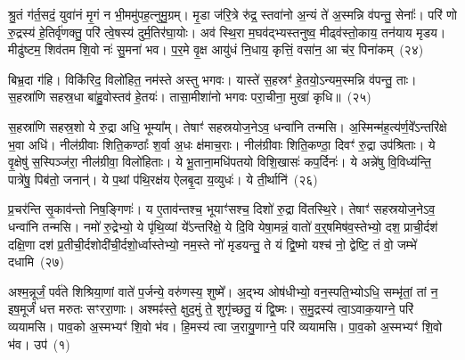 श्रु॒तं ग॑र्त॒सदं॒ युवा॑नं मृ॒गं न भी॒ममु॑पह॒त्नुमु॒ग्रम्। मृ॒डा ज॑रि॒त्रे रु॑द्र॒ स्तवा॑नो अ॒न्यं ते॑ अ॒स्मन्नि व॑पन्तु॒ सेनाः᳚। परि॑ णो रु॒द्रस्य॑ हे॒तिर्वृ॑णक्तु॒ परि॑ त्वे॒षस्य॑ दुर्म॒तिर॑घा॒योः। अव॑ स्थि॒रा म॒घव॑द्भ्यस्तनुष्व॒ मीढ्व॑स्तो॒काय॒ तन॑याय मृडय। मीढु॑ष्टम॒ शिव॑तम शि॒वो नः॑ सु॒मना॑ भव। प॒र॒मे वृ॒क्ष आयु॑धं नि॒धाय॒ कृत्तिं॒ वसा॑न॒ आ च॑र॒ पिना॑कम्~(२४)

बिभ्र॒दा ग॑हि। विकि॑रिद॒ विलो॑हित॒ नम॑स्ते अस्तु भगवः। यास्ते॑ स॒हस्रꣳ॑ हे॒तयो॒\-ऽन्यम॒स्मन्नि व॑पन्तु॒ ताः। स॒हस्रा॑णि सहस्र॒धा बा॑हु॒वोस्तव॑ हे॒तयः॑। तासा॒मीशा॑नो भगवः परा॒चीना॒ मुखा॑ कृधि॥~(२५)

{\anuvakamend[{अ॒स्मिꣴ स्त॒नुवः॑ स्तु॒हि पिना॑क॒मेका॒न्नत्रि॒ꣳ॒शच्च॑}]}%

स॒हस्रा॑णि सहस्र॒शो ये रु॒द्रा अधि॒ भूम्या᳚म्। तेषाꣳ॑ सहस्रयोज॒ने\-ऽव॒ धन्वा॑नि तन्मसि। अ॒स्मिन्म॑ह॒त्य॑र्ण॒वे᳚\-ऽ\-न्तरि॑क्षे भ॒वा अधि॑। नील॑ग्रीवाः शिति॒कण्ठाः᳚ श॒र्वा अ॒धः क्ष॑माच॒राः। नील॑ग्रीवाः शिति॒कण्ठा॒ दिवꣳ॑ रु॒द्रा उप॑श्रिताः। ये वृ॒क्षेषु॑ स॒स्पिञ्ज॑रा॒ नील॑ग्रीवा॒ विलो॑हिताः। ये भू॒ताना॒मधि॑पतयो विशि॒खासः॑ कप॒र्दिनः॑। ये अन्ने॑षु वि॒विध्य॑न्ति॒ पात्रे॑षु॒ पिब॑तो॒ जनान्॑। ये प॒थां प॑थि॒रक्ष॑य ऐलबृ॒दा य॒व्युधः॑। ये ती॒र्थानि॑~(२६)

प्र॒चर॑न्ति सृ॒काव॑न्तो निष॒ङ्गिणः॑। य ए॒ताव॑न्तश्च॒ भूयाꣳ॑सश्च॒ दिशो॑ रु॒द्रा वि॑तस्थि॒रे। तेषाꣳ॑ सहस्रयोज॒ने\-ऽव॒ धन्वा॑नि तन्मसि। नमो॑ रु॒द्रेभ्यो॒ ये पृ॑थि॒व्यां ये᳚\-ऽन्तरि॑क्षे॒ ये दि॒वि येषा॒मन्नं॒ वातो॑ व॒र्॒\mbox{}षमिष॑व॒स्तेभ्यो॒ दश॒ प्राची॒र्दश॑ दक्षि॒णा दश॑ प्र॒तीची॒र्दशोदी॑ची॒र्दशो॒र्ध्वास्तेभ्यो॒ नम॒स्ते नो॑ मृडयन्तु॒ ते यं द्वि॒ष्मो यश्च॑ नो॒ द्वेष्टि॒ तं वो॒ जम्भे॑ दधामि~(२७)


{\anuvakamend[{ती॒र्थानि॒ यश्च॒ षट्च॑}]}%

{}


\setcounter{anuvakam}{0}
अश्म॒न्नूर्जं॒ पर्व॑ते शिश्रिया॒णां वाते॑ प॒र्जन्ये॒ वरु॑णस्य॒ शुष्मे᳚। अ॒द्भ्य ओष॑धीभ्यो॒ वन॒स्पति॒भ्यो\-ऽधि॒ सम्भृ॑तां॒ तां न॒ इष॒मूर्जं॑ धत्त मरुतः सꣳररा॒णाः। अश्मꣴ॑स्ते॒ क्षुद॒मुं ते॒ शुगृ॑च्छतु॒ यं द्वि॒ष्मः। स॒मु॒द्रस्य॑ त्वा॒\-ऽवाक॒याग्ने॒ परि॑ व्ययामसि। पाव॒को अ॒स्मभ्यꣳ॑ शि॒वो भ॑व। हि॒मस्य॑ त्वा ज॒रायु॒णाग्ने॒ परि॑ व्ययामसि। पा॒व॒को अ॒स्मभ्यꣳ॑ शि॒वो भ॑व। उप॑~(१)


